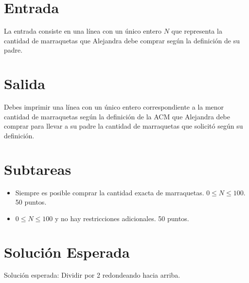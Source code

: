 \documentclass{article}
\begin{document}
\section*{Entrada}
La entrada consiste en una línea con un único entero $N$ que representa la
cantidad de marraquetas que Alejandra debe comprar según la definición de su
padre.

\section*{Salida}
Debes imprimir una línea con un único entero correspondiente a la menor cantidad
de marraquetas según la definición de la ACM que Alejandra debe comprar para
llevar a su padre la cantidad de marraquetas que solicitó según su definición.


\section*{Subtareas}
\begin{itemize}
\item Siempre es posible comprar la cantidad exacta de marraquetas. $0 \leq N \leq 100$. 50 puntos.
\item $0 \leq N \leq 100$ y no hay restricciones adicionales. 50 puntos.
\end{itemize}


\section*{Solución Esperada}
Solución esperada: Dividir por 2 redondeando hacia arriba.


 
\end{document}
